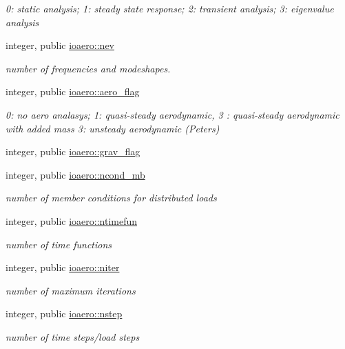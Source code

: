 \begin{DoxyCompactItemize}
\begin{DoxyCompactList}\small\item\em 0\+: static analysis; 1\+: steady state response; 2\+: transient analysis; 3\+: eigenvalue analysis \end{DoxyCompactList}\item 
integer, public \hyperlink{namespaceioaero_a1216c8699aea9eb27e3d795cc9d8d271}{ioaero\+::nev}
\begin{DoxyCompactList}\small\item\em number of frequencies and modeshapes. \end{DoxyCompactList}\item 
integer, public \hyperlink{namespaceioaero_afb280b6ca8de323c9a07076df81a71e1}{ioaero\+::aero\+\_\+flag}
\begin{DoxyCompactList}\small\item\em 0\+: no aero analasys; 1\+: quasi-\/steady aerodynamic, 3 \+: quasi-\/steady aerodynamic with added mass 3\+: unsteady aerodynamic (Peters) \end{DoxyCompactList}\item 
integer, public \hyperlink{namespaceioaero_a831fe87d45ef05e3e29a8c4c2fc88c8f}{ioaero\+::grav\+\_\+flag}
\item 
integer, public \hyperlink{namespaceioaero_ab9193f4ff70a22ae5858118fc653f22b}{ioaero\+::ncond\+\_\+mb}
\begin{DoxyCompactList}\small\item\em number of member conditions for distributed loads \end{DoxyCompactList}\item 
integer, public \hyperlink{namespaceioaero_a8d0cfe1f4a5677d76ba3f3e775b12d1e}{ioaero\+::ntimefun}
\begin{DoxyCompactList}\small\item\em number of time functions \end{DoxyCompactList}\item 
integer, public \hyperlink{namespaceioaero_ac008486fd12e0029a1ef77b3ca5e12c3}{ioaero\+::niter}
\begin{DoxyCompactList}\small\item\em number of maximum iterations \end{DoxyCompactList}\item 
integer, public \hyperlink{namespaceioaero_ab078a397454a22b07a19ae3a7443a561}{ioaero\+::nstep}
\begin{DoxyCompactList}\small\item\em number of time steps/load steps \end{DoxyCompactList}\item 

\end{DoxyCompactItemize}
